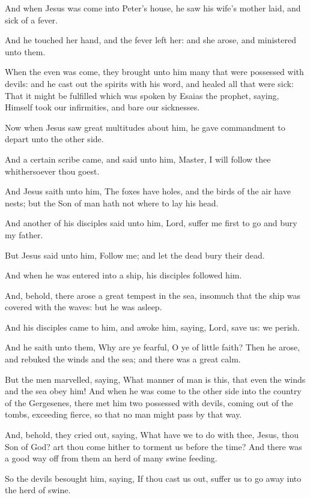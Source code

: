 \Verse And when Jesus was come into Peter's house, he saw his wife's mother laid, and sick of a fever.

\Verse And he touched her hand, and the fever left her: and she arose, and ministered unto them.

\Verse When the even was come, they brought unto him many that were possessed with devils: and he cast out the spirits with his word, and healed all that were sick: \Verse That it might be fulfilled which was spoken by Esaias the prophet, saying, Himself took our infirmities, and bare our sicknesses.

\Verse Now when Jesus saw great multitudes about him, he gave commandment to depart unto the other side.

\Verse And a certain scribe came, and said unto him, Master, I will follow thee whithersoever thou goest.

\Verse And Jesus saith unto him, The foxes have holes, and the birds of the air have nests; but the Son of man hath not where to lay his head.

\Verse And another of his disciples said unto him, Lord, suffer me first to go and bury my father.

\Verse But Jesus said unto him, Follow me; and let the dead bury their dead.

\Verse And when he was entered into a ship, his disciples followed him.

\Verse And, behold, there arose a great tempest in the sea, insomuch that the ship was covered with the waves: but he was asleep.

\Verse And his disciples came to him, and awoke him, saying, Lord, save us: we perish.

\Verse And he saith unto them, Why are ye fearful, O ye of little faith?  Then he arose, and rebuked the winds and the sea; and there was a great calm.

\Verse But the men marvelled, saying, What manner of man is this, that even the winds and the sea obey him!  \Verse And when he was come to the other side into the country of the Gergesenes, there met him two possessed with devils, coming out of the tombs, exceeding fierce, so that no man might pass by that way.

\Verse And, behold, they cried out, saying, What have we to do with thee, Jesus, thou Son of God? art thou come hither to torment us before the time?  \Verse And there was a good way off from them an herd of many swine feeding.

\Verse So the devils besought him, saying, If thou cast us out, suffer us to go away into the herd of swine.

